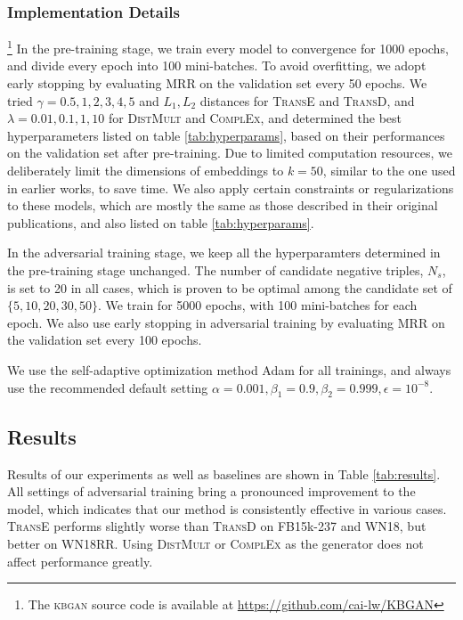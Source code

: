\documentclass[11pt,a4paper]{article}
\begin{document}
\subsubsection{Implementation Details}\footnote{The \textsc{kbgan} source code is available at \url{https://github.com/cai-lw/KBGAN}}
In the pre-training stage, we train every model to convergence for 1000 epochs, and divide every epoch into 100 mini-batches. To avoid overfitting, we adopt early stopping by evaluating MRR on the validation set every 50 epochs. We tried $\gamma=0.5,1,2,3,4,5$ and $L_1, L_2$ distances for \textsc{TransE} and \textsc{TransD}, and $\lambda=0.01,0.1,1,10$ for \textsc{DistMult} and \textsc{ComplEx}, and determined the best hyperparameters listed on table \ref{tab:hyperparams}, based on their performances on the validation set after pre-training. Due to limited computation resources, we deliberately limit the dimensions of embeddings to $k=50$, similar to the one used in earlier works, to save time. We also apply certain constraints or regularizations to these models, which are mostly the same as those described in their original publications, and also listed on table \ref{tab:hyperparams}.

In the adversarial training stage, we keep all the hyperparamters determined in the pre-training stage unchanged. The number of candidate negative triples, $N_s$, is set to 20 in all cases, which is proven to be optimal among the candidate set of $\{5, 10, 20, 30, 50\}$. We train for 5000 epochs, with 100 mini-batches for each epoch. We also use early stopping in adversarial training by evaluating MRR on the validation set every 100 epochs.

We use the self-adaptive optimization method Adam \cite{adam} for all trainings, and always use the recommended default setting $\alpha=0.001, \beta_1=0.9, \beta_2=0.999, \epsilon=10^{-8}$.

\subsection{Results}
Results of our experiments as well as baselines are shown in Table \ref{tab:results}. All settings of adversarial training bring a pronounced improvement to the model, which indicates that our method is consistently effective in various cases. \textsc{TransE} performs slightly worse than \textsc{TransD} on FB15k-237 and WN18, but better on WN18RR. Using \textsc{DistMult} or \textsc{ComplEx} as the generator does not affect performance greatly.
\end{document}
